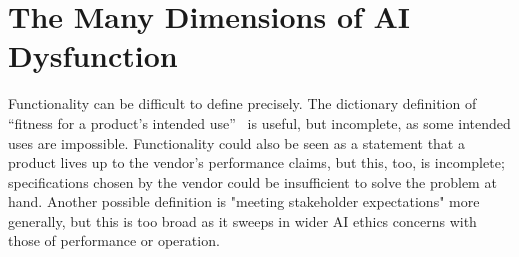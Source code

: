 \documentclass[acmconf,manuscript,screen,natbib=true]{acmart}
\begin{document}
\section{The Many Dimensions of AI Dysfunction}
\label{taxonomy}


Functionality can be difficult to define precisely. The dictionary definition of ``fitness for a product's intended use''~\cite{OED} is useful, but incomplete, as some intended uses are impossible. Functionality could also be seen as a statement that a product lives up to the vendor's performance claims, but this, too, is incomplete; specifications chosen by the vendor could be insufficient to solve the problem at hand. 
Another possible definition is "meeting stakeholder expectations" more generally, but this is too broad as it sweeps in wider AI ethics concerns with those of performance or operation.



\end{document}
